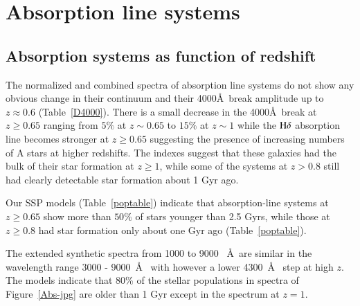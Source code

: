 \documentclass[referee]{aa}
\begin{document}

\section{Absorption line systems}
\label{absorption}


\subsection{Absorption systems as function of redshift}


The normalized and combined spectra of absorption line systems do not show any obvious change in their continuum and their 4000\AA\ break amplitude up to 
$z \approx 0.6$ (Table~\ref{D4000}). There is a small decrease in the  4000\AA\ break at
$z \geq 0.65$ ranging from  $5\%$ at $z \sim 0.65$ to $15 \%$ at $z \sim 1$ while the
$\rm H \delta$ absorption line becomes stronger at $z \geq 0.65$ suggesting 
the presence of increasing numbers of A stars at higher redshifts.  The indexes suggest that these galaxies 
had the bulk of their star formation at $z \geq 1$, while some of the systems at $z > 0.8$ still had clearly 
detectable star formation about 1 Gyr ago.

Our SSP models (Table~\ref{poptable})  indicate that absorption-line systems at $z \geq 0.65$ show more than 
$50 \%$ of stars younger than 2.5 Gyrs, while those at $z \geq 0.8$ had star formation only about one Gyr ago 
(Table~\ref{poptable}).

The extended synthetic spectra from 1000 to 9000 ~\AA ~are similar in the wavelength range  3000 - 9000~\AA~
with however a lower 4300~\AA~ step at high $z$. The models indicate that 80\% of the stellar populations in spectra
of Figure~\ref{Abs-jpg} are older than 1 Gyr except in the spectrum at $z = 1$.

\end{document}
